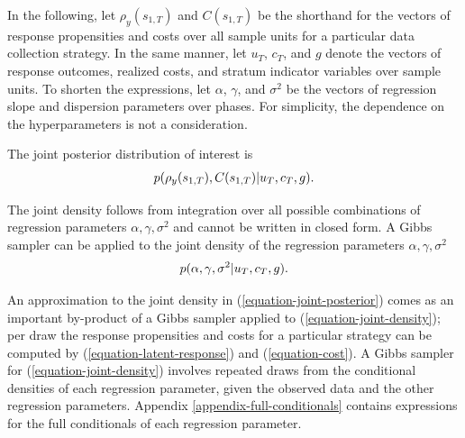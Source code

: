 \documentclass[12pt]{article}
\begin{document}
In the following, let $\rho_y(s_{1,T})$ and $C(s_{1,T})$ be the shorthand for the vectors of response propensities and costs over all sample units for a particular data collection strategy.
In the same manner, let $u_T$, $c_T$, and $g$ denote the vectors of response outcomes, realized costs, and stratum indicator variables over sample units.
To shorten the expressions, let $\alpha$, $\gamma$, and $\sigma^2$ be the vectors of regression slope and dispersion parameters over phases.
For simplicity, the dependence on the hyperparameters is not a consideration.

The joint posterior distribution of interest is
\let\saveeqnno\theequation
\let\savefrac\frac
\def\dispfrac{\displaystyle\savefrac}
\begin{eqnarray}
\let\frac\dispfrac
\gdef\theequation{9}
\let\theHequation\theequation
\label{equation-joint-posterior}
	p(\rho_y(s_{1,T}),C(s_{1,T})|u_T,c_T,g).
\end{eqnarray}
\global\let\theequation\saveeqnno
\addtocounter{equation}{-1}\ignorespaces

The joint density follows from integration over all possible combinations of regression parameters $\alpha,\gamma,\sigma^2$ and cannot be written in closed form. A Gibbs sampler can be applied to the joint density of the regression parameters $\alpha,\gamma,\sigma^2$
\let\saveeqnno\theequation
\let\savefrac\frac
\def\dispfrac{\displaystyle\savefrac}
\begin{eqnarray}
\let\frac\dispfrac
\gdef\theequation{10}
\let\theHequation\theequation
\label{equation-joint-density}
	p(\alpha,\gamma,\sigma^2|u_T,c_T,g).
\end{eqnarray}
\global\let\theequation\saveeqnno
\addtocounter{equation}{-1}\ignorespaces

An approximation to the joint density in (\ref{equation-joint-posterior}) comes as an important by-product of a Gibbs sampler applied to (\ref{equation-joint-density}); per draw the response propensities and costs for a particular strategy can be computed by (\ref{equation-latent-response}) and (\ref{equation-cost}). A Gibbs sampler for (\ref{equation-joint-density}) involves repeated draws from the conditional densities of each regression parameter, given the observed data and the other regression parameters. Appendix \ref{appendix-full-conditionals} contains expressions for the full conditionals of each regression parameter.
\end{document}
